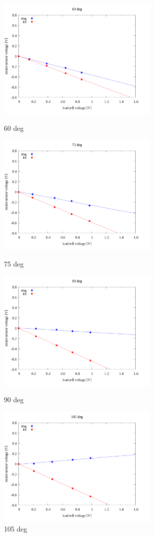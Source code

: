 \documentclass[twocolumn,a4j]{jsarticle}
\begin{document}
\begin{figure}[htbp]
    \footnotesize
    \begin{center}
        \includegraphics[width=78mm]{../images/linear/60_linear.png}
        \caption{60 deg}
        \includegraphics[width=78mm]{../images/linear/75_linear.png}
        \caption{75 deg}
        \includegraphics[width=78mm]{../images/linear/90_linear.png}
        \caption{90 deg}
        \includegraphics[width=78mm]{../images/linear/105_linear.png}
        \caption{105 deg}
    \end{center}
\end{figure}
\end{document}

